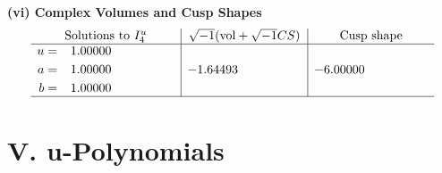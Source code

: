 \documentclass[1p]{elsarticle_modified}
\theoremstyle{definition}
\newcommand{\I}{\sqrt{-1}}
\begin{document}
\newpage\flushleft \textbf{(vi) Complex Volumes and Cusp Shapes}
$$\begin{array}{c|c|c}  
\text{Solutions to }I^u_{4}& \I (\text{vol} + \sqrt{-1}CS) & \text{Cusp shape}\\
 \hline 
\begin{aligned}
u &= \phantom{-}1.00000\phantom{ +0.000000I} \\
a &= \phantom{-}1.00000\phantom{ +0.000000I} \\
b &= \phantom{-}1.00000\phantom{ +0.000000I}\end{aligned}
 & -1.64493\phantom{ +0.000000I} & -6.00000\phantom{ +0.000000I}\\
 \hline 
 \end{array}$$\newpage
\newpage\renewcommand{\arraystretch}{1}
\centering \section*{ V. u-Polynomials}
\end{document}
